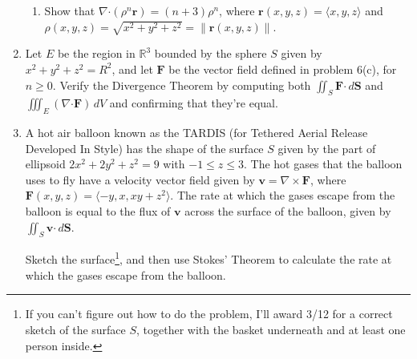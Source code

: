\documentclass[12pt]{article}
\newcommand{\points}[1]{\marginpar{\hspace{24pt}[#1]}}
\newcommand{\R}{\mathbb{R}}
\renewcommand{\S}{\mathbf{S}}
\renewcommand{\r}{\mathbf{r}}
\newcommand{\dotp}{\boldsymbol{\cdot}}
\newcommand{\di}{\displaystyle}
\newcommand{\F}{\mathbf{F}}
\begin{document}
\begin{enumerate}
\begin{enumerate}
\item Show that $\nabla\dotp (\rho^n\r)=(n+3)\rho^n$, where $\r(x,y,z) = \langle x,y,z\rangle$ and $\rho(x,y,z) = \sqrt{x^2+y^2+z^2} = \lVert\r(x,y,z)\rVert$. \points{4}
\end{enumerate}

\newpage

\item Let $E$ be the region in $\R^3$ bounded by the sphere $S$ given by $x^2+y^2+z^2=R^2$, and let $\F$ be the vector field defined in problem 6(c), for $n\geq 0$. 
Verify the Divergence Theorem by computing both $\iint_S \F\dotp\,d\S$ and $\iiint_E (\nabla\dotp\F)\,dV$ and confirming that they're equal. \points{12}

\newpage

\item A hot air balloon known as the TARDIS (for Tethered Aerial Release Developed In Style) has the shape of the surface $S$ given by the part of ellipsoid $2x^2+2y^2+z^2=9$ with $-1\leq z\leq 3$. The hot gases that the balloon uses to fly have a velocity vector field given by $\mathbf{v} = \nabla\times \F$, where $\F(x,y,z) = \langle -y, x, xy+z^2\rangle$. The rate at which the gases escape from the balloon is equal to the flux of $\mathbf{v}$ across the surface of the balloon, given by $\di \iint_S \mathbf{v}\dotp\,d\S$. 
 
Sketch the surface\footnote{If you can't figure out how to do the problem, I'll award 3/12 for a correct sketch of the surface $S$, together with the basket underneath and at least one person inside.}, and then use Stokes' Theorem to calculate the rate at which the gases escape from the balloon. \points{12}
\end{enumerate}
\end{document}
